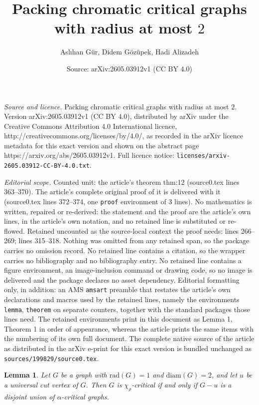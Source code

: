 \documentclass[10pt,a4paper]{amsart}
\title{Packing chromatic critical graphs with radius at most $2$}
\author{Asl{\i}han G\"ur, Didem G\"oz\"upek, Hadi Alizadeh}
\date{Source: arXiv:2605.03912v1 (CC BY 4.0)}
\newtheorem{lemma}{Lemma}
\begin{document}
\maketitle

\noindent\emph{Source and licence.} Packing chromatic critical graphs with radius at most $2$. Version arXiv:2605.03912v1 (CC BY 4.0), distributed by arXiv under the Creative Commons Attribution 4.0 International licence, http://creativecommons.org/licenses/by/4.0/, as recorded in the arXiv licence metadata for this exact version and shown on the abstract page https://arxiv.org/abs/2605.03912v1. Full licence notice: \texttt{licenses/arxiv-2605.03912-CC-BY-4.0.txt}.\par\smallskip

\noindent\textit{Editorial scope.} Counted unit: the article's theorem thm:12 (source0.tex lines 363--370). The article's complete original proof of it is delivered with it (source0.tex lines 372--374, one \texttt{proof} environment of 3 lines). No mathematics is written, repaired or re-derived: the statement and the proof are the article's own lines, in the article's own notation, and no retained line is substituted or re-flowed.  Retained uncounted as the source-local context the proof needs: lines 266--269; lines 315--318.  Nothing was omitted from any retained span, so the package carries no omission record.  No retained line contains a citation, so the wrapper carries no bibliography and no bibliography entry.  No retained line contains a figure environment, an image-inclusion command or drawing code, so no image is delivered and the package declares no asset dependency.  Editorial formatting only, in addition: an AMS \texttt{amsart} preamble that restates the article's own declarations and macros used by the retained lines, namely the environments \texttt{lemma}, \texttt{theorem} on separate counters, together with the standard packages those lines need.  The retained environments print in this document as Lemma 1, Theorem 1 in order of appearance, whereas the article prints the same items with the numbering of its own full document.  The complete native source of the article as distributed in the arXiv e-print for this exact version is bundled unchanged as \texttt{sources/199829/source0.tex}.
\begin{lemma}\label{thm:iff-universal-cut}
Let $G$ be a graph with $\mathrm{rad}(G) = 1$  and  $\mathrm{diam}(G) = 2$, and let $u$ be a universal cut vertex of $G$. 
Then $G$ is $\chi_\rho$-critical if and only if $G-u$ is a disjoint union of $\alpha$-critical graphs. 
\end{lemma}
\end{document}
